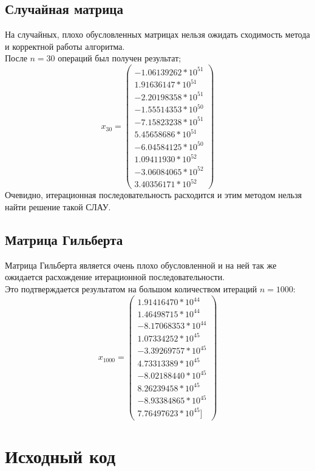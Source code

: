 \documentclass[../../report.tex]{subfiles}
\begin{document}
\subsection{Случайная матрица}
На случайных, плохо обусловленных матрицах нельзя ожидать сходимость метода и корректной работы алгоритма. \\
После $n=30$ операций был получен результат;
\[
x_{30} =
\begin{pmatrix}
    -1.06139262 * 10^{51} \\
     1.91636147 * 10^{51} \\ 
    -2.20198358 * 10^{51} \\ 
    -1.55514353 * 10^{50} \\
    -7.15823238 * 10^{51} \\ 
     5.45658686 * 10^{51} \\
    -6.04584125 * 10^{50} \\
     1.09411930 * 10^{52} \\
    -3.06084065 * 10^{52} \\
     3.40356171 * 10^{52}
\end{pmatrix}
\]
Очевидно, итерационная последовательность расходится и этим методом нельзя найти решение такой СЛАУ.

\subsection{Матрица Гильберта}
Матрица Гильберта является очень плохо обусловленной и на ней так же ожидается расхождение итерационной последовательности. \\
Это подтверждается результатом на большом количеством итераций $n=1000$:
\[
x_{1000} =
\begin{pmatrix}
     1.91416470 * 10^{44} \\
     1.46498715 * 10^{44} \\
    -8.17068353 * 10^{44} \\
     1.07334252 * 10^{45} \\
    -3.39269757 * 10^{45} \\
     4.73313389 * 10^{45} \\
    -8.02188440 * 10^{45} \\
     8.26239458 * 10^{45} \\
    -8.93384865 * 10^{45} \\
     7.76497623 * 10^{45}]
\end{pmatrix}
\]

\section{Исходный код}
\end{document}

